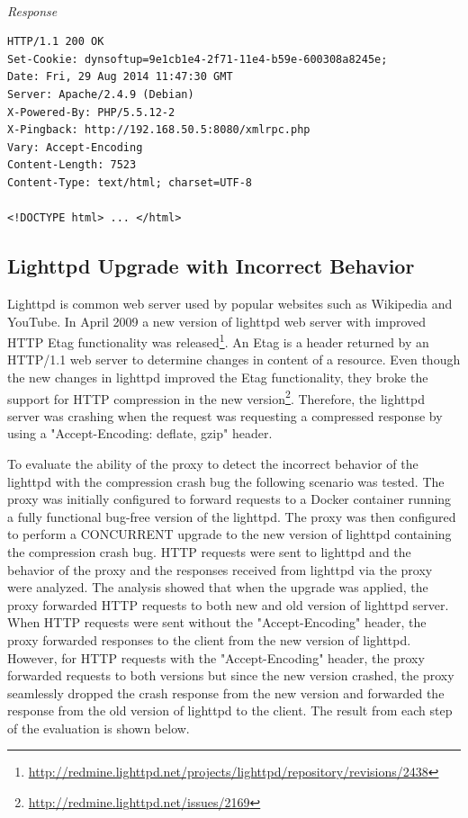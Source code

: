 \documentclass[a4paper,11pt,twoside]{report}
\begin{document}
\noindent\\
\textit{Response}
\begin{lstlisting}[language=terminal] 
HTTP/1.1 200 OK
Set-Cookie: dynsoftup=9e1cb1e4-2f71-11e4-b59e-600308a8245e;
Date: Fri, 29 Aug 2014 11:47:30 GMT
Server: Apache/2.4.9 (Debian)
X-Powered-By: PHP/5.5.12-2
X-Pingback: http://192.168.50.5:8080/xmlrpc.php
Vary: Accept-Encoding
Content-Length: 7523
Content-Type: text/html; charset=UTF-8

<!DOCTYPE html> ... </html>
\end{lstlisting}
 


\subsection{Lighttpd Upgrade with Incorrect Behavior} 
Lighttpd is common web server used by popular websites such as Wikipedia and YouTube. In April 2009 a new version of lighttpd web server with improved HTTP Etag functionality was released\footnote{\url{http://redmine.lighttpd.net/projects/lighttpd/repository/revisions/2438}}. An Etag is a header returned by an HTTP/1.1 web server to determine changes in content of a resource. Even though the new changes in lighttpd improved the Etag functionality, they broke the support for HTTP compression in the new version\footnote{\url {http://redmine.lighttpd.net/issues/2169}}. Therefore, the lighttpd server was crashing when the request was requesting a compressed response by using a "Accept-Encoding: deflate, gzip" header.

To evaluate the ability of the proxy to detect the incorrect behavior of the lighttpd with the compression crash bug the following scenario was tested. The proxy was initially configured to forward requests to a Docker container running a fully functional bug-free version of the lighttpd. The proxy was then configured to perform a CONCURRENT upgrade to the new version of lighttpd containing the compression crash bug. HTTP requests were sent to lighttpd and the behavior of the proxy and the responses received from lighttpd via the proxy were analyzed. The analysis showed that when the upgrade was applied, the proxy forwarded HTTP requests to both new and old version of lighttpd server. When HTTP requests were sent without the "Accept-Encoding" header, the proxy forwarded responses to the client from the new version of lighttpd. However, for HTTP requests with the "Accept-Encoding" header, the proxy forwarded requests to both versions but since the new version crashed, the proxy seamlessly dropped the crash response from the new version and forwarded the response from the old version of lighttpd to the client. The result from each step of the evaluation is shown below.
\end{document}
